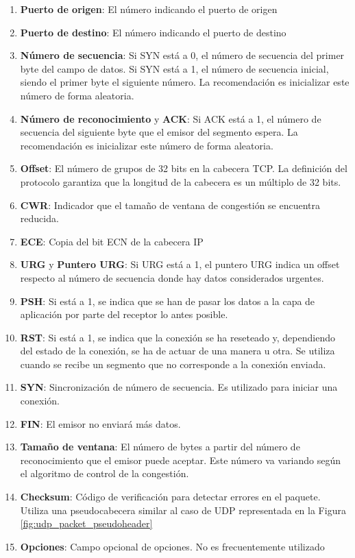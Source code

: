 \begin{enumerate}
    \item \textbf{Puerto de origen}: El número indicando el puerto de origen
    \item \textbf{Puerto de destino}:  El número indicando el puerto de destino
    \item \textbf{Número de secuencia}: Si SYN está a 0, el número de secuencia del primer byte del campo de datos. Si SYN está a 1, el número de secuencia inicial, siendo el primer byte el siguiente número. La recomendación es inicializar este número de forma aleatoria.
    \item \textbf{Número de reconocimiento} y \textbf{ACK}: Si ACK está a 1, el número de secuencia del siguiente byte que el emisor del segmento espera.  La recomendación es inicializar este número de forma aleatoria.
    \item \textbf{Offset}: El número de grupos de 32 bits en la cabecera TCP. La definición del protocolo garantiza que la longitud de la cabecera es un múltiplo de 32 bits.
    \item \textbf{CWR}: Indicador que el tamaño de ventana de congestión se encuentra reducida.
    \item \textbf{ECE}: Copia del bit ECN de la cabecera IP
    \item \textbf{URG} y \textbf{Puntero URG}: Si URG está a 1, el puntero URG indica un offset respecto al número de secuencia donde hay datos considerados urgentes.
    \item \textbf{PSH}: Si está a 1, se indica que se han de pasar los datos a la capa de aplicación por parte del receptor lo antes posible.
    \item \textbf{RST}: Si está a 1, se indica que la conexión se ha reseteado y, dependiendo del estado de la conexión, se ha de actuar de una manera u otra. Se utiliza cuando se recibe un segmento que no corresponde a la conexión enviada.
    \item \textbf{SYN}: Sincronización de número de secuencia. Es utilizado para iniciar una conexión.
    \item \textbf{FIN}: El emisor no enviará más datos. 
    \item \textbf{Tamaño de ventana}: El número de bytes a partir del número de reconocimiento que el emisor puede aceptar. Este número va variando según el algoritmo de control de la congestión.
    \item \textbf{Checksum}: Código de verificación para detectar errores en el paquete. Utiliza una pseudocabecera similar al caso de UDP representada en la Figura \ref{fig:udp_packet_pseudoheader}
    \item \textbf{Opciones}: Campo opcional de opciones. No es frecuentemente utilizado
\end{enumerate}
